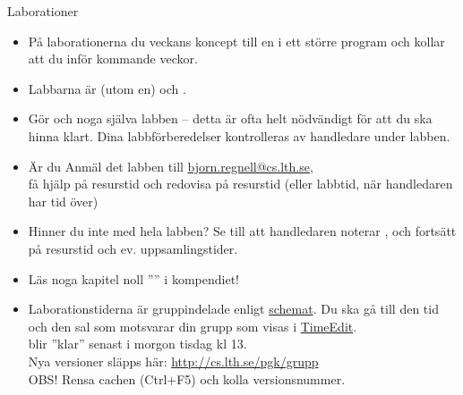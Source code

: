 \begin{Slide}{Laborationer}\SlideFontSmall
\begin{itemize}
\item På laborationerna  du veckans koncept till en  i ett större program och kollar att du  inför kommande veckor.
\item Labbarna är  (utom en) och .

\item Gör  och  noga  själva labben -- detta är ofta helt nödvändigt för att du ska hinna klart. Dina labbförberedelser kontrolleras av handledare under labben.

\item Är du  Anmäl det  labben till \url{bjorn.regnell@cs.lth.se}, \\ få hjälp på resurstid och redovisa på resurstid (eller labbtid, när handledaren har tid över)

\item Hinner du inte med hela labben? Se till att handledaren noterar , och fortsätt på resurstid och ev. uppsamlingstider.

\item Läs noga kapitel noll '''' i kompendiet!

\item Laborationstiderna är gruppindelade enligt \href{http://cs.lth.se/pgk/schema/}{schemat}. Du ska gå till den tid och den sal som motsvarar din grupp som visas i \href{http://cs.lth.se/pgk/schema/timeedit/}{TimeEdit}.\\
 blir ''klar'' senast i morgon tisdag kl 13.
\\Nya versioner släpps här: \url{http://cs.lth.se/pgk/grupp}
\\OBS! Rensa cachen (Ctrl+F5) och kolla versionsnummer.
\end{itemize}
\end{Slide}

